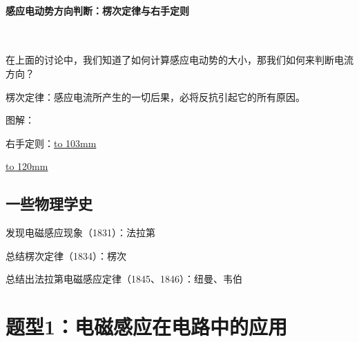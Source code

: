 \documentclass{ctexbook}
\begin{document}
	\hspace*{\fill}
	
	\hspace*{\fill}
	
	\hspace*{\fill}
	
	\hspace*{\fill}
	
	\hspace*{\fill}
	
	\hspace*{\fill}
	
	\hspace*{\fill}
	
	\hspace*{\fill}
	
	\hspace*{\fill}
	\paragraph{感应电动势方向判断：楞次定律与右手定则}~{}
	\\
	\indent
	
	在上面的讨论中，我们知道了如何计算感应电动势的大小，那我们如何来判断电流方向？
	
	楞次定律：感应电流所产生的一切后果，必将反抗引起它的所有原因。
	
	图解：
	\hspace*{\fill}
	
	\hspace*{\fill}
	
	\hspace*{\fill}
	
	\hspace*{\fill}
	
	\hspace*{\fill}
	
	右手定则：\underline{\hbox to 103mm{}}
	
	\underline{\hbox to 120mm{}}
	
	\subsection{一些物理学史}
	发现电磁感应现象（1831）：法拉第
	
	总结楞次定律（1834）：楞次
	
	总结出法拉第电磁感应定律（1845、1846）：纽曼、韦伯
	
	\newpage
	
	\section{题型1：电磁感应在电路中的应用}
	
\end{document}
